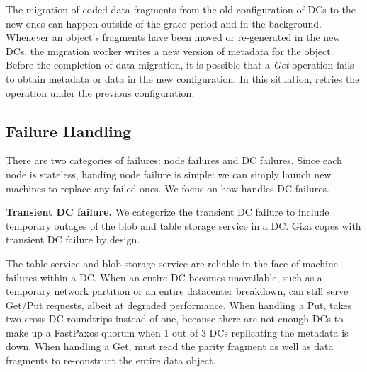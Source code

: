 The migration of coded data fragments from the old configuration of DCs to the
new ones can happen outside of the grace period and in the background. Whenever
an object's fragments have been moved or re-generated in the new DCs, the
migration worker writes a new version of metadata for the object.
Before the completion of data migration, it is possible that a {\em Get} operation 
fails to obtain metadata or data in the new configuration.  In this situation, 
{\name} retries the operation under the previous configuration.


\subsection{Failure Handling}

There are two categories of failures: {\name} node failures and DC failures.
Since each \name node is stateless, handing node failure is simple: we can
simply launch new machines to replace any failed ones.  We focus on how \name
handles DC failures.

{\bf Transient DC failure.}
We categorize the transient DC failure to include temporary outages of the blob
and table storage service in a DC.  Giza copes with transient DC failure by
design.


The table service and blob storage service are reliable in the face of machine
failures within a DC.  When an entire DC becomes unavailable, such as a
temporary network partition or an entire datacenter breakdown, {\name} can
still serve Get/Put requests, albeit at degraded performance. When handling a Put, 
\name takes two cross-DC roundtrips instead of one,
because there are not enough DCs to make up a FastPaxos quorum when 1 out of 3 DCs
replicating the metadata is down.  When handling a Get, \name must read the parity 
fragment as well as data fragments to re-construct the entire data object.

